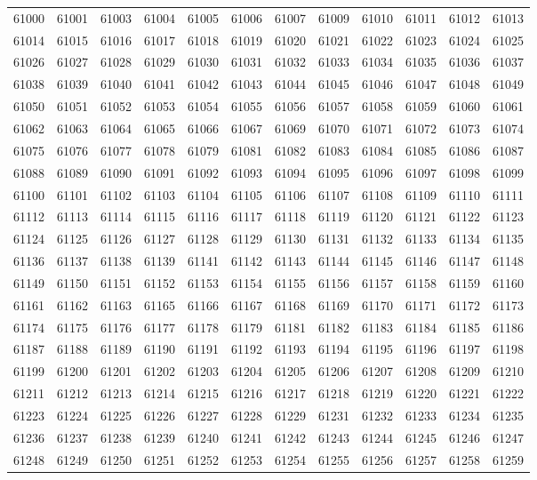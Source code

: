 \begin{center}
\begin{longtable}{llllllllllll}
61000 &61001 &61003 &61004 &61005 &61006 &61007 &61009 &61010 &61011 &61012 &61013 \\
61014 &61015 &61016 &61017 &61018 &61019 &61020 &61021 &61022 &61023 &61024 &61025 \\
61026 &61027 &61028 &61029 &61030 &61031 &61032 &61033 &61034 &61035 &61036 &61037 \\
61038 &61039 &61040 &61041 &61042 &61043 &61044 &61045 &61046 &61047 &61048 &61049 \\
61050 &61051 &61052 &61053 &61054 &61055 &61056 &61057 &61058 &61059 &61060 &61061 \\
61062 &61063 &61064 &61065 &61066 &61067 &61069 &61070 &61071 &61072 &61073 &61074 \\
61075 &61076 &61077 &61078 &61079 &61081 &61082 &61083 &61084 &61085 &61086 &61087 \\
61088 &61089 &61090 &61091 &61092 &61093 &61094 &61095 &61096 &61097 &61098 &61099 \\
61100 &61101 &61102 &61103 &61104 &61105 &61106 &61107 &61108 &61109 &61110 &61111 \\
61112 &61113 &61114 &61115 &61116 &61117 &61118 &61119 &61120 &61121 &61122 &61123 \\
61124 &61125 &61126 &61127 &61128 &61129 &61130 &61131 &61132 &61133 &61134 &61135 \\
61136 &61137 &61138 &61139 &61141 &61142 &61143 &61144 &61145 &61146 &61147 &61148 \\
61149 &61150 &61151 &61152 &61153 &61154 &61155 &61156 &61157 &61158 &61159 &61160 \\
61161 &61162 &61163 &61165 &61166 &61167 &61168 &61169 &61170 &61171 &61172 &61173 \\
61174 &61175 &61176 &61177 &61178 &61179 &61181 &61182 &61183 &61184 &61185 &61186 \\
61187 &61188 &61189 &61190 &61191 &61192 &61193 &61194 &61195 &61196 &61197 &61198 \\
61199 &61200 &61201 &61202 &61203 &61204 &61205 &61206 &61207 &61208 &61209 &61210 \\
61211 &61212 &61213 &61214 &61215 &61216 &61217 &61218 &61219 &61220 &61221 &61222 \\
61223 &61224 &61225 &61226 &61227 &61228 &61229 &61231 &61232 &61233 &61234 &61235 \\
61236 &61237 &61238 &61239 &61240 &61241 &61242 &61243 &61244 &61245 &61246 &61247 \\
61248 &61249 &61250 &61251 &61252 &61253 &61254 &61255 &61256 &61257 &61258 &61259 \\

\end{longtable}
\end{center}
